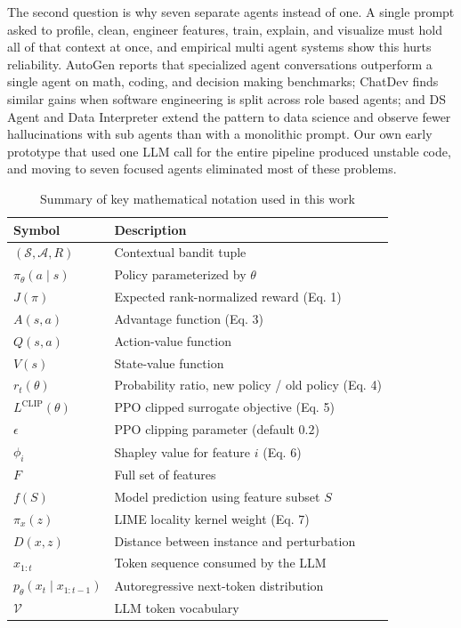 \documentclass{article}
\begin{document}
The second question is why seven separate agents instead of one. A single
prompt asked to profile, clean, engineer features, train, explain, and
visualize must hold all of that context at once, and empirical multi agent
systems show this hurts reliability. AutoGen \citep{wu2024autogen} reports
that specialized agent conversations outperform a single agent on math,
coding, and decision making benchmarks; ChatDev \citep{qian2024chatdev}
finds similar gains when software engineering is split across role based
agents; and DS Agent \citep{guo2024dsagent} and Data Interpreter
\citep{Hong2024data} extend the pattern to data science and observe fewer
hallucinations with sub agents than with a monolithic prompt. Our own early
prototype that used one LLM call for the entire pipeline produced unstable
code, and moving to seven focused agents eliminated most of these problems.

\begin{table}[h]
\centering
\caption{Summary of key mathematical notation used in this work}
\begin{tabular}{@{}ll@{}}
\toprule
\textbf{Symbol} & \textbf{Description} \\
\midrule
$(\mathcal{S}, \mathcal{A}, R)$ & Contextual bandit tuple \\
$\pi_\theta(a \mid s)$ & Policy parameterized by $\theta$ \\
$J(\pi)$ & Expected rank-normalized reward (Eq. 1) \\
$A(s, a)$ & Advantage function (Eq. 3) \\
$Q(s, a)$ & Action-value function \\
$V(s)$ & State-value function \\
$r_t(\theta)$ & Probability ratio, new policy / old policy (Eq. 4) \\
$L^{\text{CLIP}}(\theta)$ & PPO clipped surrogate objective (Eq. 5) \\
$\epsilon$ & PPO clipping parameter (default $0.2$) \\
$\phi_i$ & Shapley value for feature $i$ (Eq. 6) \\
$F$ & Full set of features \\
$f(S)$ & Model prediction using feature subset $S$ \\
$\pi_x(z)$ & LIME locality kernel weight (Eq. 7) \\
$D(x, z)$ & Distance between instance and perturbation \\
$x_{1:t}$ & Token sequence consumed by the LLM \\
$p_\theta(x_t \mid x_{1:t-1})$ & Autoregressive next-token distribution \\
$\mathcal{V}$ & LLM token vocabulary \\
\bottomrule
\end{tabular}
\end{table}
\end{document}
